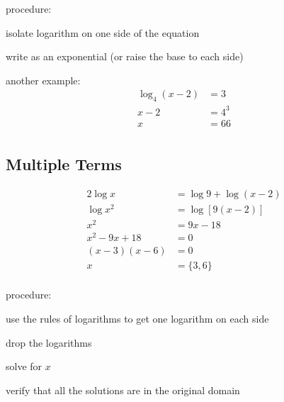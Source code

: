 \documentclass{exam}
\begin{document}
  procedure:
  \begin{itemize*}
    \item isolate logarithm on one side of the equation
    \item write as an exponential (or raise the base to each side)
  \end{itemize*}
  
  another example:
  \begin{align*}
    \log_4 (x - 2) &= 3 \\
    x - 2        &= 4^3 \\
    x            &= 66 \\
  \end{align*}

  \subsection{Multiple Terms}

  \begin{align*}
    2 \log x       &= \log 9 + \log(x - 2) \\
    \log x^2       &= \log [9(x - 2)] \\
    x^2            &= 9x - 18 \\
    x^2 - 9x + 18  &= 0 \\
    (x - 3)(x - 6) &= 0 \\
    x              &= \{ 3, 6 \} \\
  \end{align*}

  procedure:
  \begin{itemize*}
    \item use the rules of logarithms to get one logarithm on each side
    \item drop the logarithms
    \item solve for $x$
    \item verify that all the solutions are in the original domain
  \end{itemize*}
\end{document}
